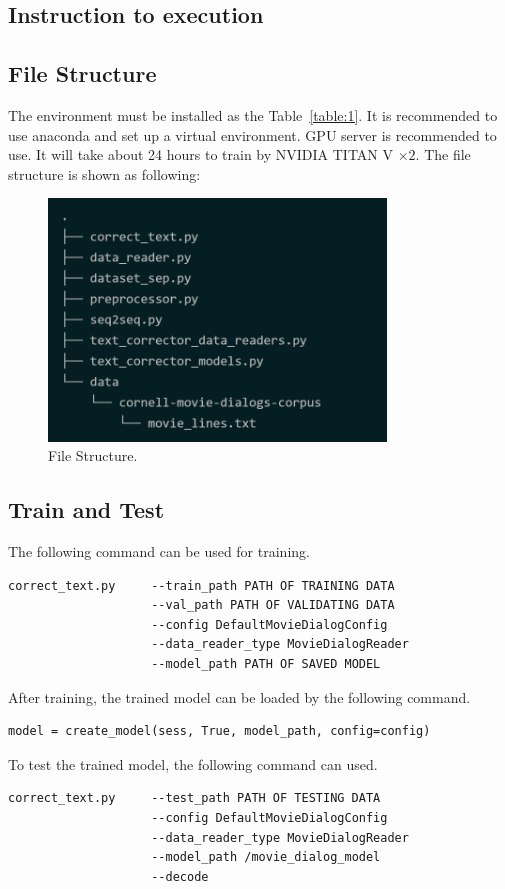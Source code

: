 \begin{appendices}
\chapter{Instruction to execution}
\section{File Structure}
The environment must be installed as the Table~\ref{table:1}. 
It is recommended to use anaconda and set up a virtual environment. GPU server is recommended to use. It will take about 24 hours to train by NVIDIA TITAN V $\times2$.
The file structure is shown as following:
\begin{figure}[ht]
    \centering
    \includegraphics[width=0.8\textwidth]{filest.png}
    \caption{File Structure.}
    \label{fig:11}
\end{figure}
\section{Train and Test}
The following command can be used for training.
\begin{lstlisting}
correct_text.py     --train_path PATH OF TRAINING DATA
                    --val_path PATH OF VALIDATING DATA
                    --config DefaultMovieDialogConfig 
                    --data_reader_type MovieDialogReader
                    --model_path PATH OF SAVED MODEL
\end{lstlisting}
After training, the trained model can be loaded by the following command.
\begin{lstlisting}
model = create_model(sess, True, model_path, config=config)
\end{lstlisting}
To test the trained model, the following command can used.
\begin{lstlisting}
correct_text.py     --test_path PATH OF TESTING DATA
                    --config DefaultMovieDialogConfig 
                    --data_reader_type MovieDialogReader 
                    --model_path /movie_dialog_model
                    --decode
\end{lstlisting}

\end{appendices}